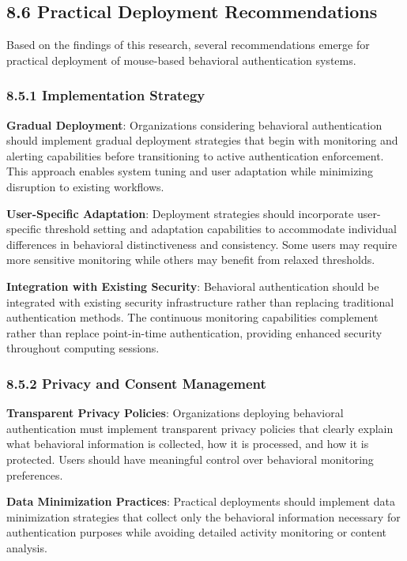 \documentclass[
  11pt,
  a4paper,
]{article}
\begin{document}
\subsection{8.6 Practical Deployment
Recommendations}\label{practical-deployment-recommendations}

Based on the findings of this research, several recommendations emerge
for practical deployment of mouse-based behavioral authentication
systems.

\subsubsection{8.5.1 Implementation
Strategy}\label{implementation-strategy}

\textbf{Gradual Deployment}: Organizations considering behavioral
authentication should implement gradual deployment strategies that begin
with monitoring and alerting capabilities before transitioning to active
authentication enforcement. This approach enables system tuning and user
adaptation while minimizing disruption to existing workflows.

\textbf{User-Specific Adaptation}: Deployment strategies should
incorporate user-specific threshold setting and adaptation capabilities
to accommodate individual differences in behavioral distinctiveness and
consistency. Some users may require more sensitive monitoring while
others may benefit from relaxed thresholds.

\textbf{Integration with Existing Security}: Behavioral authentication
should be integrated with existing security infrastructure rather than
replacing traditional authentication methods. The continuous monitoring
capabilities complement rather than replace point-in-time
authentication, providing enhanced security throughout computing
sessions.

\subsubsection{8.5.2 Privacy and Consent
Management}\label{privacy-and-consent-management}

\textbf{Transparent Privacy Policies}: Organizations deploying
behavioral authentication must implement transparent privacy policies
that clearly explain what behavioral information is collected, how it is
processed, and how it is protected. Users should have meaningful control
over behavioral monitoring preferences.

\textbf{Data Minimization Practices}: Practical deployments should
implement data minimization strategies that collect only the behavioral
information necessary for authentication purposes while avoiding
detailed activity monitoring or content analysis.
\end{document}
